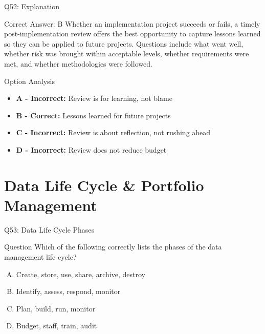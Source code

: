 \documentclass{beamer}
\begin{document}
	\begin{frame}{Q52: Explanation}
		\begin{block}{Correct Answer: B}
			Whether an implementation project succeeds or fails, a timely post-implementation review offers the best opportunity to capture lessons learned so they can be applied to future projects. Questions include what went well, whether risk was brought within acceptable levels, whether requirements were met, and whether methodologies were followed.
		\end{block}
		\begin{block}{Option Analysis}
			\begin{itemize}
				\item \textbf{A - Incorrect:} Review is for learning, not blame
				\item \textbf{B - Correct:} Lessons learned for future projects
				\item \textbf{C - Incorrect:} Review is about reflection, not rushing ahead
				\item \textbf{D - Incorrect:} Review does not reduce budget
			\end{itemize}
		\end{block}
	\end{frame}
	
	
	\section{Data Life Cycle \& Portfolio Management}
	
	\begin{frame}{Q53: Data Life Cycle Phases}
		\begin{block}{Question}
			Which of the following correctly lists the phases of the data management life cycle?
		\end{block}
		\begin{enumerate}[(A)]
			\item Create, store, use, share, archive, destroy
			\item Identify, assess, respond, monitor
			\item Plan, build, run, monitor
			\item Budget, staff, train, audit
		\end{enumerate}
	\end{frame}
	
\end{document}
